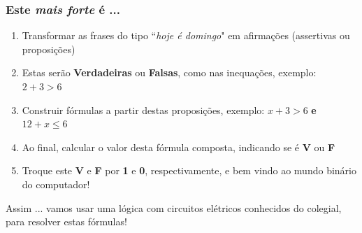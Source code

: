\documentclass{beamer}
\begin{document}
\begin{frame}
\frametitle{Este \textit{mais forte} é ...}

\begin{block}{}
\begin{enumerate}
  \item Transformar as frases do tipo ``\textit{hoje é domingo}" \/ em afirmações 
  (assertivas ou proposições)   
  \item Estas serão \textbf{Verdadeiras} ou \textbf{Falsas}, como nas inequações, exemplo: $2+3 > 6$
  \item Construir fórmulas a partir destas proposições, exemplo: $x + 3 > 6$ \textbf{e} $12 + x \le 6$ 
  \item Ao final, calcular o valor desta fórmula composta, indicando se é \textbf{V} ou \textbf{F}
  \item Troque este \textbf{V} e \textbf{F} por \textbf{1} e \textbf{0}, respectivamente,
  e bem vindo ao mundo binário do computador!

\end{enumerate}
\end{block}

\pause
\begin{alertblock}{Assim ...}
vamos usar uma lógica com circuitos elétricos conhecidos do colegial,
para resolver estas fórmulas!
\end{alertblock}


\end{frame}
\end{document}
